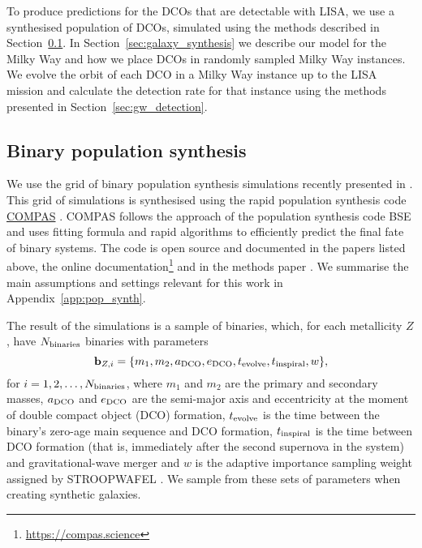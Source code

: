 To produce predictions for the DCOs that are detectable with LISA, we use a synthesised population of DCOs, simulated using the methods described in Section~\ref{sec:COMPAS_explained}. In Section~\ref{sec:galaxy_synthesis} we describe our model for the Milky Way and how we place DCOs in randomly sampled Milky Way instances. We evolve the orbit of each DCO in a Milky Way instance up to the LISA mission and calculate the detection rate for that instance using the methods presented in Section~\ref{sec:gw_detection}.

\subsection{Binary population synthesis}\label{sec:COMPAS_explained}

We use the grid of \nModels{} binary population synthesis simulations recently presented in \citet{Broekgaarden+2021,Broekgaarden+2021b}. This grid of simulations is synthesised using the rapid population synthesis code \href{https://compas.science}{COMPAS} \citep{Stevenson+2017,Vigna-Gomez+2018,Stevenson+2019,Broekgaarden+2019}. COMPAS follows the approach of the population synthesis code BSE \citep{Hurley+2000,Hurley+2002} and uses fitting formula and rapid algorithms to efficiently predict the final fate of binary systems. The code is open source and documented in the papers listed above, the online documentation\footnote{\url{https://compas.science}} and in the methods paper \citep{COMPAS:2021methodsPaper}. We summarise the main assumptions and settings relevant for this work in Appendix~\ref{app:pop_synth}.

The result of the simulations is a sample of binaries, which, for each metallicity $Z$, have $N_{\rm binaries}$ binaries with parameters
\begin{equation}
    \mathbf{b}_{{Z, i}} = \{m_1, m_2, a_{\rm DCO}, e_{\rm DCO}, t_{\rm evolve}, t_{\rm inspiral}, w\},
\end{equation}
for $i = 1, 2, \dots, N_{\rm binaries}$, where $m_1$ and $m_2$ are the primary and secondary masses, $a_{\rm DCO}$ and $e_{\rm DCO}$ are the semi-major axis and eccentricity at the moment of double compact object (DCO) formation, $t_{\rm evolve}$ is the time between the binary's zero-age main sequence and DCO formation, $t_{\rm inspiral}$ is the time between DCO formation (that is, immediately after the second supernova in the system) and gravitational-wave merger and $w$ is the adaptive importance sampling weight assigned by STROOPWAFEL \cite[][Eq.~7]{Broekgaarden+2019}. We sample from these sets of parameters when creating synthetic galaxies.

